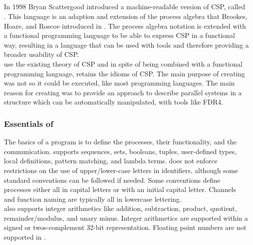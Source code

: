 \subsection{\cspm{}}
In 1998 Bryan Scattergood introduced a machine-readable version of CSP, called \cspm. This language is an adaption and extension of the process algebra that Brookes, Hoare, and Roscoe introduced in \cite{Brookes1984}. The process algebra notation is extended with a functional programming language to be able to express CSP in a functional way, resulting in a language that can be used with tools and therefore providing a broader usability of CSP.\\

\cspm{} use the existing theory of CSP and in spite of being combined with a functional programming language, \cspm{} retains the idioms of CSP.
The main purpose of creating \cspm{} was not so it could be executed, like most programming languages. The main reason for creating \cspm{} was to provide an approach to describe parallel systems in a structure which can be automatically manipulated, with tools like FDR4.

\subsubsection{Essentials of \cspm}
The basics of a \cspm{} program is to define the processes, their functionality, and the communication. \cspm{} supports sequences, sets, booleans, tuples, user-defined types, local definitions, pattern matching, and lambda terms.
\cspm{} does not enforce restrictions on the use of upper/lower-case letters in identifiers, although some standard conventions can be followed if needed. Some conventions define processes either all in capital letters or with an initial capital letter. Channels and function naming are typically all in lowercase lettering.\\

\cspm{} also supports integer arithmetics like addition, subtraction, product, quotient, remainder/modulus, and unary minus. Integer arithmetics are supported within a signed or twos-complement 32-bit representation.
Floating point numbers are not supported in \cspm. \\

